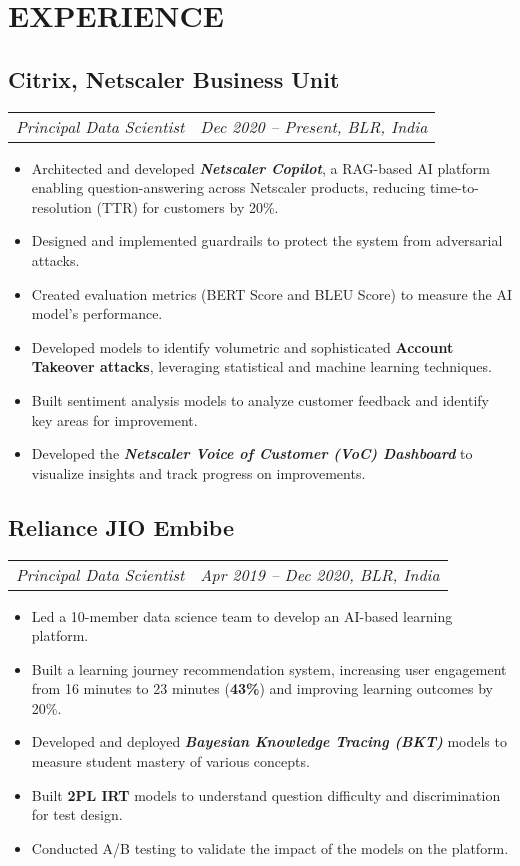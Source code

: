 \documentclass[11pt,a4paper]{moderncv}
\newcommand*{\experienceentry}[5][1mm]{
    \subsection{#2} \vspace{-1.5mm}
    \small{
    \begin{tabularx}{\textwidth}{LR}
        {\itshape #3} & {\itshape #4, #5}
    \end{tabularx}
    }
    \par\addvspace{#1}
}
\begin{document}
\maketitle
\vspace{-10.0mm}

\begin{minipage}[t]{0.64\textwidth}
\section{EXPERIENCE}

\experienceentry{Citrix, Netscaler Business Unit}{Principal Data Scientist}{Dec 2020 -- Present}{BLR, India}
\vspace{-5mm}
\begin{small}
\begin{itemize}
    \item Architected and developed \textbf{\textit{Netscaler Copilot}}, a RAG-based AI platform enabling question-answering across Netscaler products, reducing time-to-resolution (TTR) for customers by 20\%.
    \item Designed and implemented guardrails to protect the system from adversarial attacks.
    \item Created evaluation metrics (BERT Score and BLEU Score) to measure the AI model’s performance.
    \item Developed models to identify volumetric and sophisticated \textbf{Account Takeover attacks}, leveraging statistical and machine learning techniques.
    \item Built sentiment analysis models to analyze customer feedback and identify key areas for improvement.
    \item Developed the \textbf{\textit{Netscaler Voice of Customer (VoC) Dashboard}} to visualize insights and track progress on improvements.
\end{itemize}
\end{small}

\vspace{0.25mm}

\experienceentry{Reliance JIO Embibe}{Principal Data Scientist}{Apr 2019 -- Dec 2020}{BLR, India}
\vspace{-5mm}
\begin{itemize}
    \item Led a 10-member data science team to develop an AI-based learning platform.
    \item Built a learning journey recommendation system, increasing user engagement from 16 minutes to 23 minutes (\textbf{43\%}) and improving learning outcomes by 20\%.
    \item Developed and deployed \textbf{\textit{Bayesian Knowledge Tracing (BKT)}} models to measure student mastery of various concepts.
    \item Built \textbf{2PL IRT} models to understand question difficulty and discrimination for test design.
    \item Conducted A/B testing to validate the impact of the models on the platform.
\end{itemize}
\vspace{0.25mm}


\end{minipage}
\end{document}
